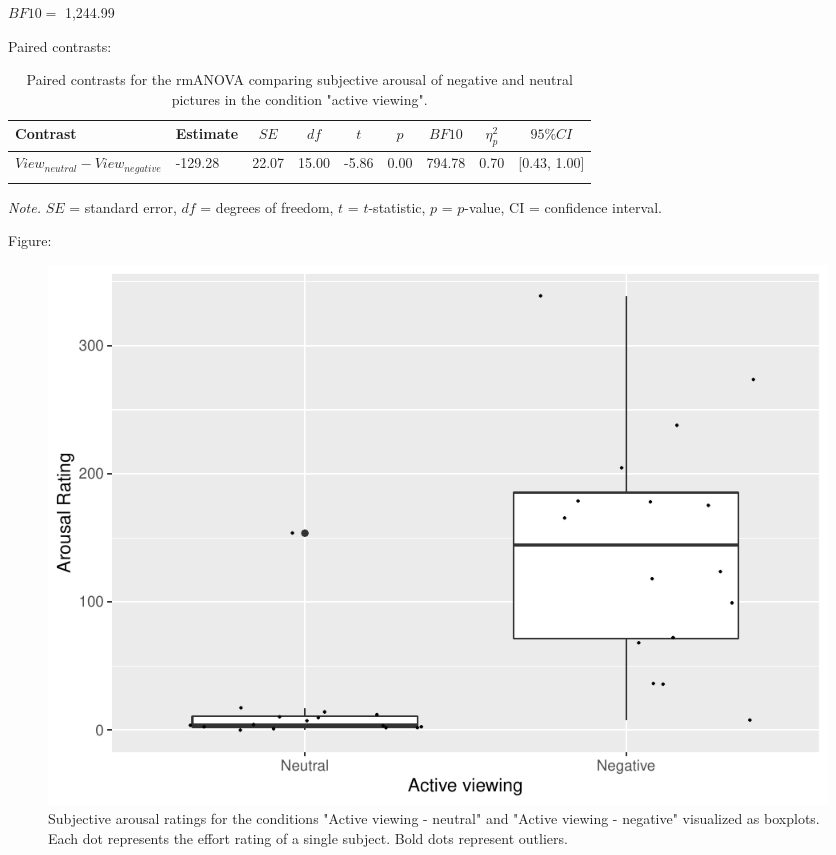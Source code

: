 \documentclass[
  english,
  man,floatsintext]{apa6}
\begin{document}
\(BF10=\) 1,244.99

Paired contrasts:

\begin{table}[H]

\begin{center}
\begin{threeparttable}

\caption{\label{tab:unnamed-chunk-3}Paired contrasts for the rmANOVA comparing subjective arousal of negative and neutral pictures in the condition "active viewing".}

\begin{tabular}{lllllllll}
\toprule
Contrast & \multicolumn{1}{c}{Estimate} & \multicolumn{1}{c}{$SE$} & \multicolumn{1}{c}{$df$} & \multicolumn{1}{c}{$t$} & \multicolumn{1}{c}{$p$} & \multicolumn{1}{c}{$BF10$} & \multicolumn{1}{c}{$\eta_{p}^{2}$} & \multicolumn{1}{c}{$95\% CI$}\\
\midrule
$View_{neutral} - View_{negative}$ & -129.28 & 22.07 & 15.00 & -5.86 & 0.00 & 794.78 & 0.70 & {}[0.43, 1.00]\\
\bottomrule
\addlinespace
\end{tabular}

\begin{tablenotes}[para]
\normalsize{\textit{Note.} $SE$ = standard error, $df$ = degrees of freedom, $t$ = $t$-statistic, $p$ = $p$-value, CI = confidence interval.}
\end{tablenotes}

\end{threeparttable}
\end{center}

\end{table}

Figure:

\begin{figure}[H]
\includegraphics[width=0.75\linewidth]{Manuscript_ERED_Stage1_files/figure-latex/FigSubjArousalViewPilot-1} \caption{Subjective arousal ratings for the conditions "Active viewing - neutral" and "Active viewing - negative" visualized as boxplots. Each dot represents the effort rating of a single subject. Bold dots represent outliers.}\label{fig:FigSubjArousalViewPilot}
\end{figure}
\end{document}
